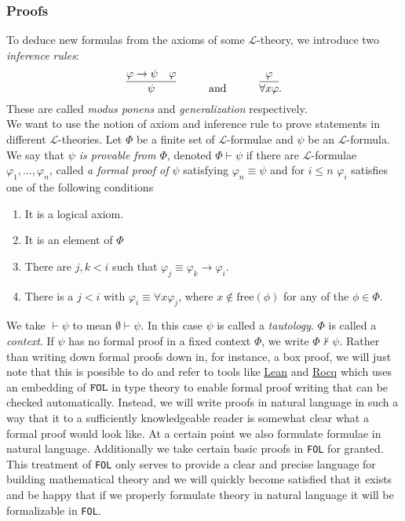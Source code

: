 \subsubsection{Proofs}
To deduce new formulas from the axioms of some $\mathcal{L}$-theory, we introduce two \emph{inference rules}: 
$$\infer{\psi}{\varphi \to \psi & \varphi} \quad \quad \quad\text{and}\quad \quad \quad  \infer{\forall x \varphi}{\varphi}.$$
These are called \emph{modus ponens} and \emph{generalization} respectively.\\
We want to use the notion of axiom and inference rule to prove statements in different $\mathcal{L}$-theories. Let $\Phi$ be a finite set of $\mathcal{L}$-formulae and $\psi$ be an $\mathcal{L}$-formula. We say that \emph{$\psi$ is provable from $\Phi$}, denoted $\Phi\vdash \psi$ if there are $\mathcal{L}$-formulae $\varphi_1,\dots,\varphi_n$, called \emph{a formal proof of $\psi$} satisfying $\varphi_n\equiv \psi$ and for $i\leq n$ $\varphi_i$ satisfies one of the following conditions 
\begin{enumerate}
    \item It is a logical axiom.
    \item It is an element of $\Phi$
    \item There are $j,k< i$ such that $\varphi_j\equiv \varphi_k \to \varphi_i$.
    \item There is a $j<i$ with $\varphi_i \equiv \forall x \varphi_j$, where $x\notin \mathrm{free}(\phi)$ for any of the $\phi\in \Phi$.
\end{enumerate} 
We take $\vdash \psi$ to mean $\emptyset \vdash \psi$. In this case $\psi$ is called a \emph{tautology}. $\Phi$ is called a \emph{context}. If $\psi$ has no formal proof in a fixed context $\Phi$, we write $\Phi \not\vdash \psi$. Rather than writing down formal proofs down in, for instance, a box proof, we will just note that this is possible to do and refer to tools like \href{https://leanprover-community.github.io/learn.html}{Lean} and \href{https://rocq-prover.org/about}{Rocq} which uses an embedding of $\verb|FOL|$ in type theory to enable formal proof writing that can be checked automatically. Instead, we will write proofs in natural language in such a way that it to a sufficiently knowledgeable reader is somewhat clear what a formal proof would look like. At a certain point we also formulate formulae in natural language. Additionally we take certain basic proofs in \verb|FOL| for granted. This treatment of \verb|FOL| only serves to provide a clear and precise language for building mathematical theory and we will quickly become satisfied that it exists and be happy that if we properly formulate theory in natural language it will be formalizable in \verb|FOL|.  
